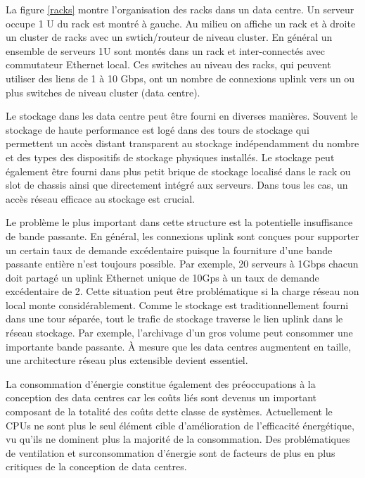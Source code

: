 La figure \ref{racks} montre l'organisation des racks dans un data centre. Un serveur occupe 1 U du rack est montré à gauche. Au milieu on affiche un rack et à droite un cluster de racks avec un swtich/routeur de niveau cluster. En général un ensemble de serveurs 1U sont montés dans un rack et inter-connectés avec commutateur Ethernet local. Ces switches au niveau des racks, qui peuvent utiliser des liens de 1 à 10 Gbps, ont un nombre de connexions uplink vers un ou plus switches de niveau cluster (data centre).

Le stockage dans les data centre peut être fourni en diverses manières. Souvent le stockage de haute performance est logé dans des \og  tours de stockage \fg{} qui permettent un accès distant transparent au stockage indépendamment du nombre et des types des dispositifs de stockage physiques installés. Le stockage peut également être fourni dans  plus petit \og  brique de stockage \fg{} localisé dans le rack ou slot de chassis ainsi que directement intégré aux serveurs. Dans tous les cas, un accès réseau efficace au stockage est crucial.

Le problème le plus important dans cette structure est la potentielle insuffisance de bande passante. En général, les connexions uplink sont conçues pour supporter un certain taux de 
demande excédentaire puisque la fourniture d'une bande passante entière n'est toujours possible. Par exemple, 20 serveurs à 1Gbps chacun doit partagé un uplink Ethernet unique de 10Gps à un taux de demande excédentaire de 2. Cette situation peut être problématique si la charge réseau non local monte considérablement. Comme le stockage est traditionnellement fourni dans une tour séparée, tout le trafic de stockage traverse le lien uplink dans le réseau stockage. Par exemple, l'archivage d'un gros volume peut consommer une importante bande passante. À mesure que les data centres augmentent en taille, une architecture réseau plus extensible devient essentiel.

La consommation d'énergie constitue également des préoccupations à la conception des data centres car les coûts liés sont devenus un important composant de la totalité des coûts dette classe de systèmes. Actuellement le CPUs ne sont plus le seul élément cible d'amélioration de l'efficacité énergétique, vu qu'ils ne dominent plus la majorité de la consommation. Des problématiques de ventilation et surconsommation d'énergie sont de facteurs de plus en plus critiques de la conception de data centres.\cite{datacenterAsComputerIntro} \cite{dataCenterEvolution}

